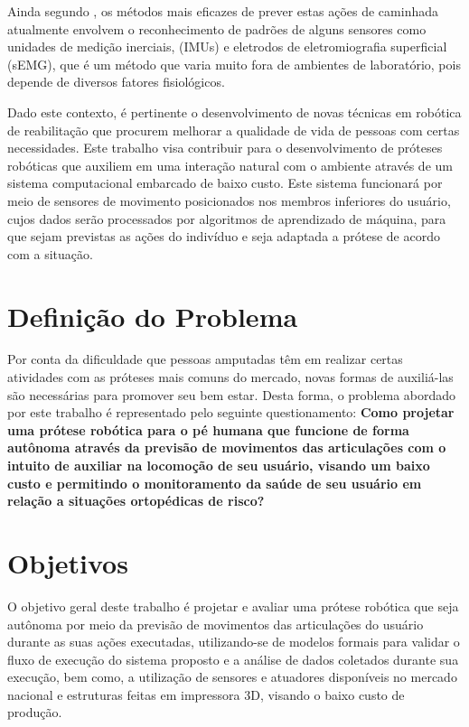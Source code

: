 Ainda segundo , os métodos mais eficazes de prever estas ações de caminhada atualmente envolvem o reconhecimento de padrões de alguns sensores como unidades de medição inerciais, (IMUs) e eletrodos de eletromiografia superficial (sEMG), que é um método que varia muito fora de ambientes de laboratório, pois depende de diversos fatores fisiológicos.

Dado este contexto, é pertinente o desenvolvimento de novas técnicas em robótica de reabilitação que procurem melhorar a qualidade de vida de pessoas com certas necessidades. Este trabalho visa contribuir para o desenvolvimento de próteses robóticas que auxiliem em uma interação natural com o ambiente através de um sistema computacional embarcado de baixo custo. Este sistema funcionará por meio de sensores de movimento posicionados nos membros inferiores do usuário, cujos dados serão processados por algoritmos de aprendizado de máquina, para que sejam previstas as ações do indivíduo e seja adaptada a prótese de acordo com a situação.

\section{Definição do Problema}

Por conta da dificuldade que pessoas amputadas têm em realizar certas atividades com as próteses mais comuns do mercado, novas formas de auxiliá-las são necessárias para promover seu bem estar. Desta forma, o problema abordado por este trabalho é representado pelo seguinte questionamento: \textbf{Como projetar uma prótese robótica para o pé humana que funcione de forma autônoma através da previsão de movimentos das articulações com o intuito de auxiliar na locomoção de seu usuário, visando um baixo custo e permitindo o monitoramento da saúde de seu usuário em relação a situações ortopédicas de risco?}	

\section{Objetivos}
\label{sec:objetivos}

O objetivo geral deste trabalho é projetar e avaliar uma prótese robótica que seja autônoma por meio da previsão de movimentos das articulações do usuário durante as suas ações executadas, utilizando-se de modelos formais para validar o fluxo de execução do sistema proposto e a análise de dados coletados durante sua execução, bem como, a utilização de sensores e atuadores disponíveis no mercado nacional e estruturas feitas em impressora 3D, visando o baixo custo de produção.


